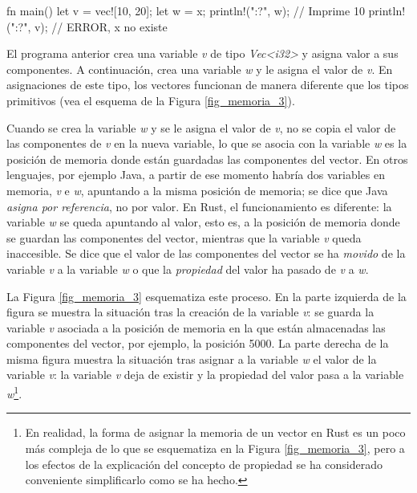 \vspace{0.7em}
\begin{Codigo}
fn main() {
   let v = vec![10, 20];
   let w = x;
   println!("{:?}", w); // Imprime 10
   println!("{:?}", v); // ERROR, x no existe
}
\end{Codigo}

El programa anterior crea una variable \textit{v} de tipo \textit{Vec<i32>} y asigna valor a sus componentes. A continuación, crea una variable \textit{w} y le asigna el valor de \textit{v}. En asignaciones de este tipo, los vectores funcionan de manera diferente que los tipos primitivos (vea el esquema de la Figura \ref{fig_memoria_3}). 

Cuando se crea la variable \textit{w} y se le asigna el valor de \textit{v}, no se copia el valor de las componentes de \textit{v} en la nueva variable, lo que se asocia con la variable \textit{w} es la posición de memoria donde están guardadas las componentes del vector. En otros lenguajes, por ejemplo Java, a partir de ese momento habría dos variables en memoria, \textit{v} e \textit{w}, apuntando a la misma posición de memoria; se dice que Java \textit{asigna por referencia}, no por valor. En Rust, el funcionamiento es diferente: la variable \textit{w} se queda apuntando al valor, esto es, a la posición de memoria donde se guardan las componentes del vector, mientras que la variable \textit{v} queda inaccesible. Se dice que el valor de las componentes del vector se ha \textit{movido} de la variable \textit{v} a la variable \textit{w} o que la \textit{propiedad} del valor ha pasado de \textit{v} a \textit{w}.

La Figura \ref{fig_memoria_3} esquematiza este proceso. En la parte izquierda de la figura se muestra la situación tras la creación de la variable \textit{v}: se guarda la variable \textit{v} asociada a la posición de memoria en la que están almacenadas las componentes del vector, por ejemplo, la posición 5000. La parte derecha de la misma figura muestra la situación tras asignar a la variable \textit{w} el valor de la variable \textit{v}: la variable \textit{v} deja de existir y la propiedad del valor pasa a la variable \textit{w}\footnote{En realidad, la forma de asignar la memoria de un vector en Rust es un poco más compleja de lo que se esquematiza en la Figura \ref{fig_memoria_3}, pero a los efectos de la explicación del concepto de propiedad se ha considerado conveniente simplificarlo como se ha hecho.}.


